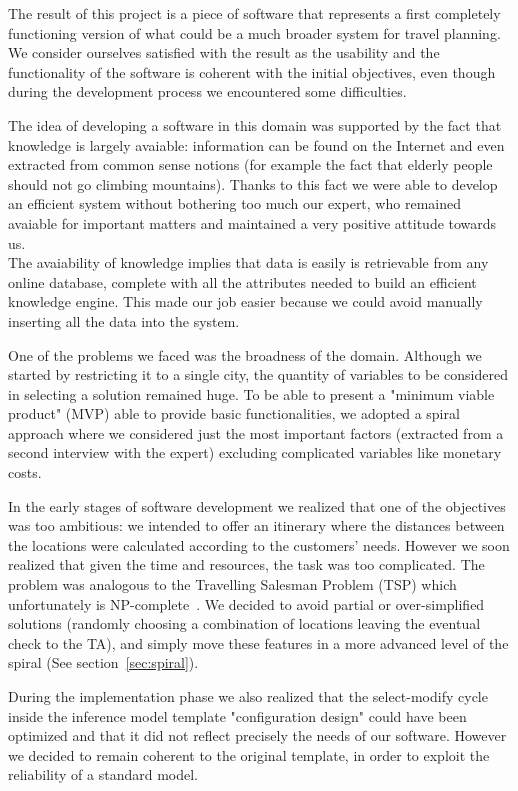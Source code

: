 \documentclass[11pt]{article} %
\begin{document}
The result of this project is a piece of software that represents a first completely functioning version of what could be a much broader system for travel planning. We consider ourselves satisfied with the result as the usability and the functionality of the software is coherent with the initial objectives, even though during the development process we encountered some difficulties.

The idea of developing a software in this domain was supported by the fact that knowledge is largely avaiable: information can be found on the Internet and even extracted from common sense notions (for example the fact that elderly people should not go climbing mountains). Thanks to this fact we were able to develop an efficient system without bothering too much our expert, who remained avaiable for important matters and maintained a very positive attitude towards us.\\
The avaiability of knowledge implies that data is easily is retrievable from any online database, complete with all the attributes needed to build an efficient knowledge engine. This made our job easier because we could avoid manually inserting all the data into the system.

One of the problems we faced was the broadness of the domain. Although we started by restricting it to a single city, the quantity of variables to be considered in selecting a solution remained huge. To be able to present a "minimum viable product" (MVP) able to provide basic functionalities, we adopted a spiral approach where we considered just the most important factors (extracted from a second interview with the expert) excluding complicated variables like monetary costs. 

In the early stages of software development we realized that one of the objectives was too ambitious: we intended to offer an itinerary where the distances between the locations were calculated according to the customers' needs. However we soon realized that given the time and resources, the task was too complicated. The problem was analogous to the Travelling Salesman Problem (TSP) which unfortunately is NP-complete~\cite{papadimitriou1977euclidean}. We decided to avoid partial or over-simplified solutions (randomly choosing a combination of locations leaving the eventual check to the TA), and simply move these features in a more advanced level of the spiral (See section~\ref{sec:spiral}).

During the implementation phase we also realized that the select-modify cycle inside the inference model template "configuration design" could have been optimized and that it did not reflect precisely the needs of our software. However we decided to remain coherent to the original template, in order to exploit the reliability of a standard model.
\end{document}
